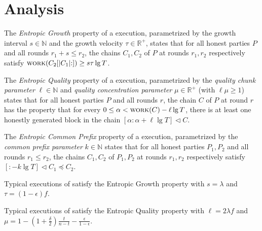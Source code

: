 \section{Analysis}

\begin{definition}
  The \emph{Entropic Growth} property of
  a \poem execution,
  parametrized by the growth interval $s \in \mathbb{N}$
  and the growth velocity $\tau \in \mathbb{R}^+$,
  states that for
  all honest parties $P$ and all rounds $r_1 + s \leq r_2$,
  the chains $C_1, C_2$ of $P$ at rounds $r_1, r_2$ respectively
  satisfy $\textsc{work}(C_2[{|C_1|}{:}]) \geq s \tau \lg T$.
\end{definition}

\begin{definition}
  The \emph{Entropic Quality} property of
  a \poem execution, parametrized by the \emph{quality chunk parameter} $\ell \in \mathbb{N}$
  and \emph{quality concentration parameter} $\mu \in \mathbb{R}^+$
  (with $\ell \mu \geq 1$)
  states that for
  all honest parties $P$ and all rounds $r$,
  the chain $C$ of $P$ at round $r$
  has the property that
  for every $0 \leq \alpha < \textsc{work}(C) - \ell \lg T$,
  there is at least one honestly generated block in the chain
  $[{\alpha}{:}{\alpha + \ell \lg T}] \lhd C$.
\end{definition}

\begin{definition}
  The \emph{Entropic Common Prefix} property of
  a \poem execution, parametrized by the \emph{common prefix parameter} $k \in \mathbb{N}$
  states that for
  all honest parties $P_1, P_2$
  and all rounds $r_1 \leq r_2$,
  the chains $C_1, C_2$ of $P_1, P_2$ at rounds $r_1, r_2$ respectively
  satisfy $[{:}{-k \lg T}] \lhd C_1 \preceq C_2$.
\end{definition}

\begin{conjecture}
  Typical executions of \poem satisfy the Entropic Growth property
  with $s = \lambda$ and $\tau = (1 - \epsilon)f$.
\end{conjecture}

\begin{conjecture}
  Typical executions of \poem satisfy the Entropic Quality property
  with $\ell = 2 \lambda f$ and
  $\mu = 1 - (1 + \frac{\delta}{2})\frac{t}{n - t} - \frac{\epsilon}{1 - \epsilon}$.
\end{conjecture}


